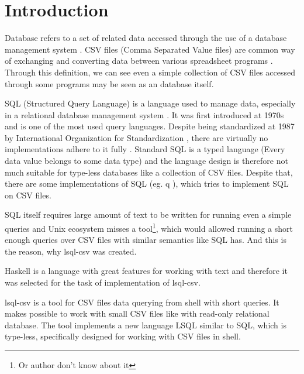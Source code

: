 \chapter*{Introduction}

Database refers to a set of related data accessed through the use of a database management system \cite{enwiki-database}.
CSV files (Comma Separated Value files) are common way of exchanging and converting data between various spreadsheet programs \cite{rfc4180}.
Through this definition, we can see even a simple collection of CSV files accessed through some programs may be seen as an database itself.


SQL (Structured Query Language) is a language used to manage data, especially in a relational database management system \cite{enwiki-sql}.
It was first introduced at 1970s \cite{enwiki-sql} and is one of the most used query languages. 
Despite being standardized at 1987 by International Organization for Standardization \cite{ISO9075-1987}, 
there are virtually no implementations adhere to it fully \cite{enwiki-sql}.
Standard SQL is a typed language (Every data value belongs to some data type) \cite{ISO9075-2023} and the language
design is therefore not much suitable for type-less databases like a collection of CSV files.
Despite that, there are some implementations of SQL (eg. q \cite{q}), which tries to implement SQL on CSV files.

SQL itself requires large amount of text to be written for running even a simple queries and Unix ecosystem misses a tool\footnote{Or author don't know about it}, 
which would allowed running a short enough queries over CSV files with similar semantics like SQL has. And this is the reason, why lsql-csv was created.

Haskell is a language with great features for working with text \cite{practical-haskell} and therefore it was selected for the task of implementation of lsql-csv.

lsql-csv is a tool for CSV files data querying from shell with short queries. It makes possible to work with small CSV files like with read-only relational database.
The tool implements a new language LSQL similar to SQL, which is type-less, specifically designed for working with CSV files in shell.
